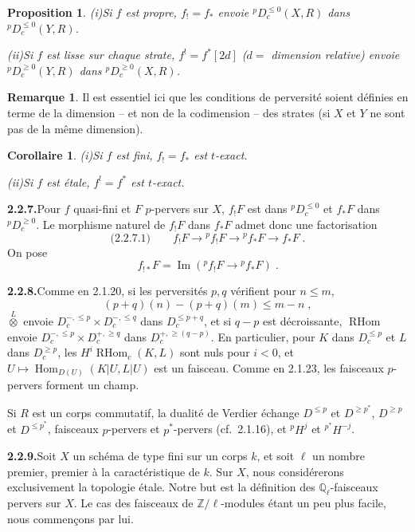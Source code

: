 \documentclass[12pt,a4paper]{article}
\theoremstyle{plain}
\newtheorem{proposition}[theorem]{Proposition}
\newtheorem{corollary}[theorem]{Corollaire}
\theoremstyle{definition}
\newtheorem{remark}[theorem]{Remarque}
\DeclareMathOperator{\Hom}{Hom}
\DeclareMathOperator{\im}{Im}
\DeclareMathOperator{\RHom}{RHom}
\begin{document}
\begin{proposition}\label{prop:2.2.5}
\emph{(i)}\quad Si $f$ est propre, $f_! = f_*$ envoie ${}^p D_c^{\leqslant 0}(X, R)$ dans ${}^p D_c^{\leqslant 0}(Y, R)$.

\emph{(ii)}\quad Si $f$ est lisse sur chaque strate, $f^! = f^*[2d]$ ($d =$ dimension relative) envoie ${}^p D_c^{\geqslant 0}(Y, R)$ dans ${}^p D_c^{\geqslant 0}(X, R)$.
\end{proposition}

\begin{remark}
Il est essentiel ici que les conditions de perversit\'e soient d\'efinies en terme de la dimension -- et non de la codimension -- des strates (si $X$ et $Y$ ne sont pas de la m\^eme dimension).
\end{remark}

\begin{corollary}\label{cor:2.2.6}
\emph{(i)}\quad Si $f$ est fini, $f_! = f_*$ est $t$-exact.

\emph{(ii)}\quad Si $f$ est \'etale, $f^! = f^*$ est $t$-exact.
\end{corollary}

\smallskip
\noindent\textbf{2.2.7.}\quad Pour $f$ quasi-fini et $F$ $p$-pervers sur $X$, $f_! F$ est dans ${}^p D_c^{\leqslant 0}$ et $f_* F$ dans ${}^p D_c^{\geqslant 0}$. Le morphisme naturel de $f_! F$ dans $f_* F$ admet donc une factorisation
\[
\text{(2.2.7.1)}\qquad f_! F \to {}^p f_! F \to {}^p f_* F \to f_* F\;.
\]
On pose
\[
f_{!*} F = \im({}^p f_! F \to {}^p f_* F)\;.
\]

\smallskip
\noindent\textbf{2.2.8.}\quad Comme en 2.1.20, si les perversit\'es $p, q$ v\'erifient pour $n \leqslant m$,
\[
(p+q)(n) - (p+q)(m) \leqslant m - n\;,
\]
$\overset{L}{\otimes}$ envoie $D_c^{-, \leqslant p} \times D_c^{-, \leqslant q}$ dans $D_c^{\leqslant p+q}$, et si $q-p$ est d\'ecroissante, $\RHom$ envoie $D_c^{-, \leqslant p} \times D_c^{+, \geqslant q}$ dans $D_c^{+, \geqslant (q-p)}$. En particulier, pour $K$ dans $D_c^{\leqslant p}$ et $L$ dans $D_c^{\geqslant p}$, les $H^i \RHom_c(K, L)$ sont nuls pour $i < 0$, et $U \mapsto \Hom_{D(U)}(K|U, L|U)$ est un faisceau. Comme en 2.1.23, les faisceaux $p$-pervers forment un champ.

Si $R$ est un corps commutatif, la dualit\'e de Verdier \'echange $D^{\leqslant p}$ et $D^{\geqslant p^*}$, $D^{\geqslant p}$ et $D^{\leqslant p^*}$, faisceaux $p$-pervers et $p^*$-pervers (cf.~2.1.16), et ${}^p H^j$ et ${}^{p^*} H^{-j}$.

\smallskip
\noindent\textbf{2.2.9.}\quad Soit $X$ un sch\'ema de type fini sur un corps $k$, et soit $\ell$ un nombre premier, premier \`a la caract\'eristique de $k$. Sur $X$, nous consid\'ererons exclusivement la topologie \'etale. Notre but est la d\'efinition des $\mathbb{Q}_\ell$-faisceaux pervers sur $X$. Le cas des faisceaux de $\mathbb{Z}/\ell$-modules \'etant un peu plus facile, nous commen\c{c}ons par lui.
\end{document}
